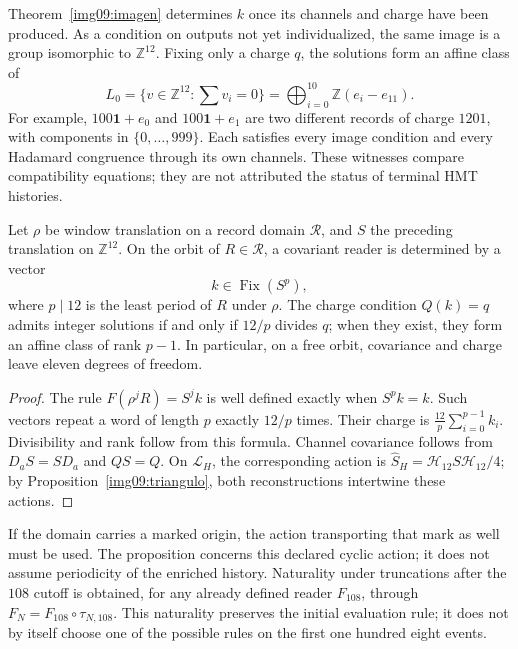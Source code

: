 Theorem~\ref{img09:imagen} determines $k$ once its
channels and charge have been produced. As a condition on outputs not yet
individualized, the same image is a group isomorphic to
$\mathbb Z^{12}$. Fixing only a charge $q$, the solutions
form an affine class of
\[
 L_0=\{v\in\mathbb Z^{12}:\sum v_i=0\}
 =\bigoplus_{i=0}^{10}\mathbb Z(e_i-e_{11}).
\]
For example, $100\mathbf1+e_0$ and $100\mathbf1+e_1$ are two
different records of charge $1201$, with components in
$\{0,\ldots,999\}$. Each satisfies every image condition
and every Hadamard congruence through its own
channels. These witnesses compare compatibility equations;
they are not attributed the status of terminal HMT histories.

\begin{proposition}
\label{img09:covariancia}
Let $\rho$ be window translation on a record domain
$\mathscr R$, and $S$ the preceding translation on $\mathbb Z^{12}$.
On the orbit of $R\in\mathscr R$, a covariant reader is
determined by a vector
\[
 k\in\operatorname{Fix}(S^p),
\]
where $p\mid12$ is the least period of $R$ under $\rho$.
The charge condition $Q(k)=q$ admits integer solutions if and only if
$12/p$ divides $q$; when they exist, they form an affine class of rank
$p-1$. In particular, on a free orbit, covariance and charge
leave eleven degrees of freedom.
\end{proposition}
\begin{proof}
The rule $F(\rho^jR)=S^jk$ is well defined exactly when
$S^pk=k$. Such vectors repeat a word of length
$p$ exactly $12/p$ times. Their charge is $\frac{12}{p}\sum_{i=0}^{p-1}k_i$.
Divisibility and rank follow from this formula. Channel
covariance follows from $D_aS=SD_a$ and $QS=Q$.
On $\mathcal L_H$, the corresponding action is
$\widehat S_H=\mathcal H_{12}S\mathcal H_{12}/4$;
by Proposition~\ref{img09:triangulo}, both reconstructions
intertwine these actions.
\end{proof}

If the domain carries a marked origin, the action transporting
that mark as well must be used. The proposition concerns this declared
cyclic action; it does not assume periodicity of the enriched
history. Naturality under truncations after the
$108$ cutoff is obtained, for any already defined reader $F_{108}$, through
$F_N=F_{108}\circ\tau_{N,108}$. This naturality preserves the initial
evaluation rule; it does not by itself choose one of the possible rules
on the first one hundred eight events.

